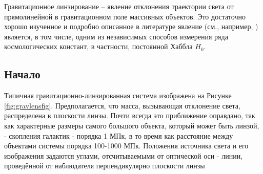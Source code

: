 Гравитационное линзирование -- явление отклонения траектории света от прямолинейной в гравитационном поле массивных объектов.  Это достаточно хорошо изученное и подробно описанное в литературе явление (см., например, \cite{gravlensbook}) является, в том числе, одним из независимых способов измерения ряда космологических констант, в частности, постоянной Хаббла $H_0$. 

\subsection{Начало}

Типичная гравитационно-линзированная система изображена на Рисунке \ref{fig:gravlensfig}. Предполагается, что масса, вызывающая отклонение света, распределена в плоскости линзы. Почти всегда это приближение оправдано, так как характерные размеры самого большого объекта, который может быть линзой, - скопления галактик - порядка 1 МПк, в то время как расстояние между объектами системы порядка 100-1000 МПк. Положения источника света и его изображения задаются углами, отсчитываемыми от оптической оси - линии, проведённой от наблюдателя перпендикулярно плоскости линзы

